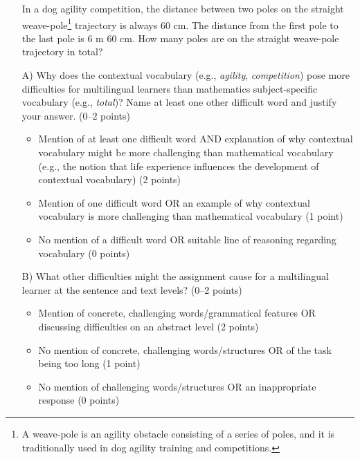 \documentclass[output=paper]{langscibook}
\begin{document}
\begin{itemize}
\item[] In a dog agility competition, the distance between two poles on the straight weave-pole\footnote{A weave-pole is an agility obstacle consisting of a series of poles, and it is traditionally used in dog agility training and competitions.} trajectory is always 60 cm. The distance from the first pole to the last pole is 6 m 60 cm. How many poles are on the straight weave-pole trajectory in total?
\end{itemize}
\begin{itemize}
	\item[A)] Why does the contextual vocabulary (e.g., \textit{agility}, \textit{competition}) pose more difficulties for multilingual learners than mathematics subject-specific vocabulary (e.g., \textit{total})? Name at least one other difficult word and justify your answer. (0–2 points)
		\begin{itemize}
			\item Mention of at least one difficult word AND explanation of why contextual vocabulary might be more challenging than mathematical vocabulary (e.g., the notion that life experience influences the development of contextual vocabulary) (2 points)
			\item Mention of one difficult word OR an example of why contextual vocabulary is more challenging than mathematical vocabulary (1 point)
			\item No mention of a difficult word OR suitable line of reasoning regarding vocabulary (0 points)
		\end{itemize} 
	\item[B)] What other difficulties might the assignment cause for a multilingual learner at the sentence and text levels? (0–2 points)
		\begin{itemize}
			\item Mention of concrete, challenging words/grammatical features OR discussing difficulties on an abstract level (2 points)
			\item No mention of concrete, challenging words/structures OR of the task being too long (1 point)
			\item No mention of challenging words/structures OR an inappropriate response (0 points)
		\end{itemize}
\end{itemize}
	
\end{document}
